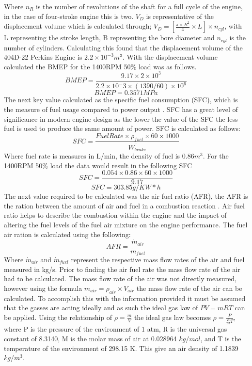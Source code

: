 \documentclass[12pt]{article}
\begin{document}
Where $n_R$ is the number of revolutions of the shaft for a full cycle of the engine, in the case of four-stroke engine this is two. $V_D$ is representative of the displacement volume which is calculated through; $V_D = [\frac{\pi \times B^2}{4}\times L]\times n_{cyl}$, with L representing the stroke length, B representing the bore diameter and $n_{cyl}$ is the number of cylinders. Calculating this found that the displacement volume of the 404D-22 Perkins Engine is $2.2 \times 10^{-3} m^3$. With the displacement volume calculated the BMEP for the 1400RPM 50\% load was as follows.
\begin{equation*}
    BMEP = \frac{9.17\times 2\times10^3}{2.2\times10^-3\times(1390/60)\times10^6}
\end{equation*}
\begin{equation*}
    BMEP = 0.3571 MPa
\end{equation*}
The next key value calculated as the specific fuel consumption (SFC), which is the measure of fuel usage compared to power output \cite{RUSSO}. SFC has a great level of significance in modern engine design as the lower the value of the SFC the less fuel is used to produce the same amount of power. SFC is calculated as follows:
\begin{equation}
    SFC = \frac{Fuel Rate\times \rho_{fuel} \times 60\times 1000}{\dot{W_{brake}}}
\end{equation}
Where fuel rate is measures in L/min, the density of fuel is $0.86m^3$. For the 1400RPM 50\% load the data would result in the following SFC
\begin{equation*}
    SFC = \frac{0.054\times 0.86\times60\times1000}{9.17}
\end{equation*}
\begin{equation*}
    SFC = 303.85 g/KW*h
\end{equation*}
The next value required to be calculated was the air fuel ratio (AFR), the AFR is the ration between the amount of air and fuel in a combustion reaction \cite{SPEIGHT}. Air fuel ratio helps to describe the combustion within the engine and the impact of altering the fuel levels of the fuel air mixture on the engine performance. The fuel air ration is calculated using the following:
\begin{equation}
    AFR = \frac{\dot{m}_{air}}{\dot{m}_{fuel}}
\end{equation}
Where $\dot{m}_{air}$ and $\dot{m}_{fuel}$ represent the respective mass flow rates of the air and fuel measured in kg/s. Prior to finding the air fuel rate the mass flow rate of the air had to be calculated. The mass flow rate of the air was not directly measured, however using the formula $m_{air} = \rho_{air}\times V_{air}$ the mass flow rate of the air can be calculated. To accomplish this with the information provided it must be assumed that the gasses are acting ideally and as such the ideal gas law of $PV = mRT$ can be applied. Using the relationship of $\rho = \frac{m}{V}$ the ideal gas law becomes $\rho = \frac{P}{\frac{R}{M}T}$, where P is the pressure of the environment of 1 atm, R is the universal gas constant of 8.3140, M is the molar mass of air at 0.028964 $kg/mol$, and T is the temperature of the environment of 298.15 K. This give an air density of 1.1839 $kg/m^3$.
\end{document}
